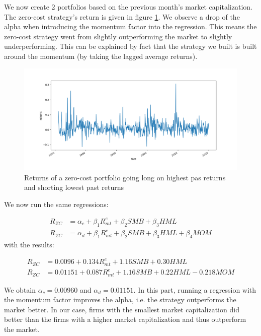 \documentclass[10pt]{article}
\begin{document}
\bigbreak

We now create 2 portfolios based on the previous month's market capitalization.  The zero-cost strategy's return is given in figure \ref{ps8_ex2_plot2}. We observe a drop of the alpha when introducing the momentum factor into the regression. This means the zero-cost strategy went from slightly outperforming the market to slightly underperforming. This can be explained by fact that the strategy we built is built around the momentum (by taking the lagged average returns).

\begin{figure}[h]
    \centering
    \includegraphics[scale=0.5]{ps8_ex2_plot2.png}
    \caption{Returns of a zero-cost portfolio going  long on highest pas returns and shorting lowest past returns}
    \label{ps8_ex2_plot2}    
\end{figure}

We now run the same regressions:

\begin{align*}	
	R_{ZC} &= \alpha_c +  \beta_1 R^e_{mt}  + \beta_2 SMB + \beta_3 HML \\
	R_{ZC}  &= \alpha_d + \beta_1 R^e_{mt} + \beta_2 SMB + \beta_3 HML + \beta_4 MOM
\end{align*}  
with the results:

\begin{align*}	
	R_{ZC} &= 0.0096 + 0.134 R^e_{mt}  + 1.16 SMB + 0.30 HML \\
	R_{ZC}  &= 0.01151 + 0.087 R^e_{mt} + 1.16 SMB + 0.22 HML - 0.218 MOM
\end{align*}  


We obtain $\alpha_{c} =  0.00960$ and $\alpha_{d} = 0.01151$. In this part, running a regression with the momentum factor improves the alpha, i.e. the strategy outperforms the market better. In our case, firms with the smallest market capitalization did better than the firms with a higher market capitalization and thus outperform the market. 
\end{document}
